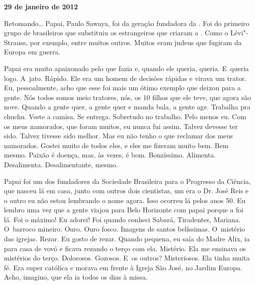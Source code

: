 \begin{center}\asterisc{}\end{center}

\begin{flushright}\textbf{29 de janeiro de 2012}\end{flushright}


Retomando… Papai, Paulo Sawaya, foi da geração fundadora da .
Foi do primeiro grupo de brasileiros que substituiu os estrangeiros que
criaram a . Como o Lévi"-Strauss, por exemplo, entre muitos outros.
Muitos eram judeus que fugiram da Europa em guerra.

Papai era muito apaixonado pelo que fazia e, quando ele queria, queria.
E~queria logo. A~jato. Rápido. Ele era um homem de decisões rápidas e
virava um trator. Eu, pessoalmente, acho que esse foi mais um ótimo
exemplo que deixou para a gente. Nós todos somos meio tratores, nós, os
10 filhos que ele teve, que agora são nove. Quando a gente quer, a gente
quer e manda bala, a gente age. Trabalha pra chuchu. Veste a camisa. Se
entrega. Sobretudo no trabalho. Pelo menos eu. Com os meus namorados,
que foram muitos, eu nunca fui assim. Talvez devesse ter sido. Talvez
tivesse sido melhor. Mas eu não tenho o que reclamar dos meus namorados.
Gostei muito de todos eles, e eles me fizeram muito bem. Bem mesmo.
Paixão é doença, mas, às vezes, é bom. Bonzíssimo. Alimenta.
Desalimenta. Desalimentante, mesmo.

Papai foi um dos fundadores da Sociedade Brasileira para o Progresso da
Ciência, que nasceu lá em casa, junto com outros dois cientistas, um era
o Dr. José Reis e o outro eu não estou lembrando o nome agora. Isso
ocorreu lá pelos anos 50. Eu lembro uma vez que a gente viajou para Belo
Horizonte com papai porque a  foi lá. Foi o máximo! Eu adorei! Foi
quando conheci Sabará, Tiradentes, Mariana. O~barroco mineiro. Ouro.
Ouro fosco. Imagens de santos belíssimas. O~mistério das igrejas.
Rezar. Eu gosto de rezar. Quando pequena, eu saía do Madre Alix, ia para
casa de vovó e ficava rezando o terço com ela. Mistério. Ela me ensinava
os mistérios do terço. Dolorosos. Gozosos. E~os outros? Misteriosos. Ela
tinha muita fé. Era super católica e morava em frente à Igreja São José,
no Jardim Europa. Acho, imagino, que ela ia todos os dias à missa.

